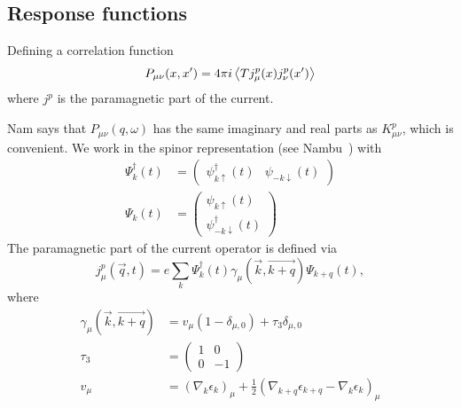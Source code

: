 \documentclass[../main.tex]{subfiles}
\begin{document}
	\subsection{Response functions} \label{subsec:}

	Defining a correlation function
	\begin{equation}
		P_{\mu\nu}(x, x') = 4 \pi i \ev{T j_\mu^p(x) j_\nu^p(x')}
	\end{equation}
	where $j^p$ is the paramagnetic part of the current.

	Nam says that $P_{\mu\nu}(q, \omega)$ has the same imaginary and real parts as $K_{\mu\nu}^p$, which is convenient.
	We work in the spinor representation (see Nambu~\autocite{Nambu1960}) with
	\begin{align}
		\Psi_k^{\dagger}(t) &= \begin{pmatrix}
							\psi_{k \uparrow}^\dagger(t) & \psi_{-k \downarrow}(t)
			\end{pmatrix} \\
		\Psi_k(t) &= \begin{pmatrix}
								\psi_{k \uparrow}(t) \\
								\psi_{-k \downarrow}^\dagger(t)
		\end{pmatrix}
	\end{align}
	The paramagnetic part of the current operator is defined via
	\begin{equation}
		j_\mu^p(\vec{q}, t) = e \sum_k \Psi_k^{\dagger}(t) \gamma_\mu(\vec{k}, \vec{k + q}) \Psi_{k + q}(t),
	\end{equation}
	where
	\begin{align}
		\gamma_\mu(\vec{k}, \vec{k + q}) &= v_\mu \left(1 - \delta_{\mu, 0} \right) + \tau_3 \delta_{\mu, 0} \\
		\tau_3 &= \begin{pmatrix}
					 1 & 0 \\
					 0 & -1
				\end{pmatrix} \\
		v_\mu &= \left( \nabla_k \epsilon_k \right)_\mu + \frac{1}{2}\left( \nabla_{k + q} \epsilon_{k + q} - \nabla_k \epsilon_k \right)_\mu
	\end{align}
\end{document}

